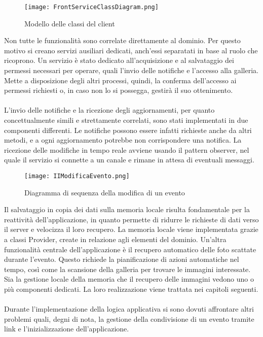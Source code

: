 \clearpage

\begin{figure}[h!]
    \begin{center}
        \texttt{[image: FrontServiceClassDiagram.png]}
        \caption{Modello delle classi del client}
    \end{center}
\end{figure}

Non tutte le funzionalità sono correlate direttamente al dominio.
Per questo motivo si creano servizi ausiliari dedicati,
anch'essi separatati in base al ruolo che ricoprono.
\clearpage
Un servizio è stato dedicato all'acquisizione e
al salvataggio dei permessi necessari per operare,
quali l'invio delle notifiche e l'accesso alla galleria.
Mette a disposizione degli altri processi, quindi,
la conferma dell'accesso ai permessi richiesti o,
in caso non lo si possegga, gestirà il suo ottenimento.\\
\\
L'invio delle notifiche e la ricezione degli aggiornamenti,
per quanto concettualmente simili e strettamente correlati,
sono stati implementati in due componenti differenti.
Le notifiche possono essere infatti richieste anche da altri metodi,
e a ogni aggiornamento potrebbe non corrispondere una notifica.
La ricezione delle modifiche in tempo reale avviene usando il pattern observer,
nel quale il servizio si connette a un canale e rimane in attesa di eventuali messaggi.\\

\begin{figure}[h!]
    \begin{center}
        \texttt{[image: IIModificaEvento.png]}
        \caption{Diagramma di sequenza della modifica di un evento}
    \end{center}
\end{figure}

\clearpage

Il salvataggio in copia dei dati sulla memoria locale
risulta fondamentale per la reattività dell'applicazione,
in quanto permette di ridurre le richieste di dati verso il server
e velocizza il loro recupero.
La memoria locale viene implementata grazie a classi Provider,
create in relazione agli elementi del dominio.
Un'altra funzionalità centrale dell'applicazione è il recupero automatico
delle foto scattate durante l'evento.
Questo richiede la pianificazione di azioni automatiche nel tempo,
così come la scansione della galleria per trovare le immagini interessate.
Sia la gestione locale della memoria che il recupero delle immagini
vedono uno o più componenti dedicati.
La loro realizzazione viene trattata nei capitoli seguenti.\\
\\
Durante l'implementazione della logica applicativa
si sono dovuti affrontare altri problemi quali, degni di nota,
la gestione della condivisione di un evento tramite link e
l'inizializzazione dell'applicazione.\\

